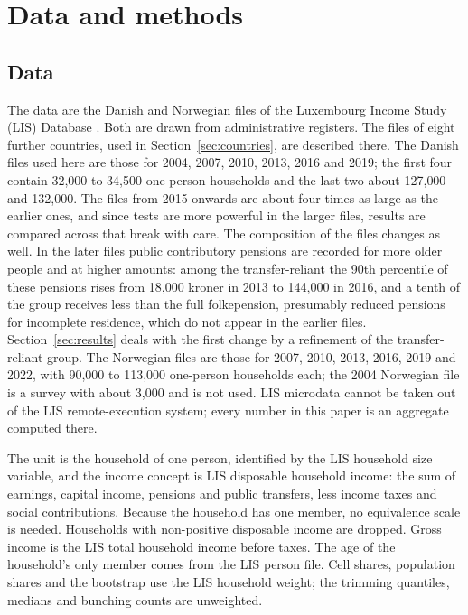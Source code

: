 \section{Data and methods}\label{sec:data}

\subsection{Data}

The data are the Danish and Norwegian files of the Luxembourg Income Study (LIS) Database \citep{LIS2024}. Both are drawn from administrative registers. The files of eight further countries, used in Section~\ref{sec:countries}, are described there. The Danish files used here are those for 2004, 2007, 2010, 2013, 2016 and 2019; the first four contain 32{,}000 to 34{,}500 one-person households and the last two about 127{,}000 and 132{,}000. The files from 2015 onwards are about four times as large as the earlier ones, and since tests are more powerful in the larger files, results are compared across that break with care. The composition of the files changes as well. In the later files public contributory pensions are recorded for more older people and at higher amounts: among the transfer-reliant the 90th percentile of these pensions rises from 18{,}000 kroner in 2013 to 144{,}000 in 2016, and a tenth of the group receives less than the full folkepension, presumably reduced pensions for incomplete residence, which do not appear in the earlier files. Section~\ref{sec:results} deals with the first change by a refinement of the transfer-reliant group. The Norwegian files are those for 2007, 2010, 2013, 2016, 2019 and 2022, with 90{,}000 to 113{,}000 one-person households each; the 2004 Norwegian file is a survey with about 3{,}000 and is not used. LIS microdata cannot be taken out of the LIS remote-execution system; every number in this paper is an aggregate computed there.

The unit is the household of one person, identified by the LIS household size variable, and the income concept is LIS disposable household income: the sum of earnings, capital income, pensions and public transfers, less income taxes and social contributions. Because the household has one member, no equivalence scale is needed. Households with non-positive disposable income are dropped. Gross income is the LIS total household income before taxes. The age of the household's only member comes from the LIS person file. Cell shares, population shares and the bootstrap use the LIS household weight; the trimming quantiles, medians and bunching counts are unweighted.

